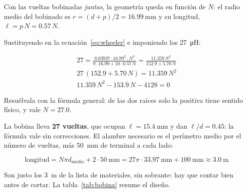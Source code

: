 \documentclass[11pt,a4paper]{article}
\begin{document}
\noindent Con las vueltas bobinadas \emph{juntas}, la geometría queda en función de $N$: el
radio medio del bobinado es $r = (d + p)/2 = \qty{16.99}{\milli\metre}$ y su longitud,
$\ell = p\,N = \num{0.57}\,N$.

\noindent Sustituyendo en la ecuación~\eqref{eq:wheeler} e imponiendo los
\qty{27}{\micro\henry}:

\begin{gather*}
    27 = \frac{\num{0.03937} \cdot \num{16.99}^{2} \cdot N^{2}}
              {9 \cdot \num{16.99} + 10 \cdot \num{0.57}\,N}
       = \frac{\num{11.359}\,N^{2}}{\num{152.9} + \num{5.70}\,N}
    \\[14pt]
    27\,(\num{152.9} + \num{5.70}\,N) = \num{11.359}\,N^{2}
    \\[14pt]
    \num{11.359}\,N^{2} - \num{153.9}\,N - \num{4128} = 0
\end{gather*}

\noindent Resuélvala con la fórmula general: de las dos raíces solo la positiva tiene sentido
físico, y vale $N = \num{27.0}$.

\noindent La bobina lleva \textbf{27 vueltas}, que ocupan
$\ell = \qty{15.4}{\milli\metre}$ y dan $\ell/d = \num{0.45}$: la fórmula vale sin
correcciones. El alambre necesario es el perímetro medio por el número de vueltas, más
\qty{50}{\milli\metre} de terminal a cada lado:

\begin{equation*}
    \text{longitud} = N \pi d_{\text{medio}} + 2 \cdot \qty{50}{\milli\metre}
                    = 27 \pi \cdot \qty{33.97}{\milli\metre} + \qty{100}{\milli\metre}
                    \approx \qty{3.0}{\metre}
\end{equation*}

\noindent Son justo los \qty{3}{\metre} de la lista de materiales, sin sobrante: hay
que contar bien antes de cortar. La tabla~\ref{tab:bobina} resume el diseño.
\end{document}
